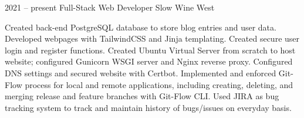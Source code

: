 \documentclass[9pt]{developercv} %
\begin{document}

\begin{entrylist}
		\entry
		{2021 -- present}
		{Full-Stack Web Developer}
		{Slow Wine West}

		{Created back-end PostgreSQL database to store blog entries and user data. Developed webpages with TailwindCSS and
		Jinja templating. Created secure user login and register functions. Created Ubuntu Virtual Server from scratch to host
		website; configured Gunicorn WSGI server and Nginx reverse proxy. Configured DNS settings and secured website with 
		Certbot. Implemented and enforced Git-Flow process for local and remote applications, including creating, deleting, and merging release and 
		feature branches with Git-Flow CLI. Used JIRA as bug tracking system to track and maintain history of bugs/issues on everyday basis. \\
		
		
		
}
\end{entrylist}
\end{document}
